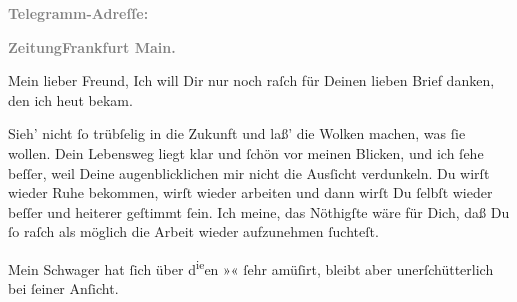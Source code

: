 \pstart
           \textcolor{gray}{\textbf{Telegramm-Adreſſe:}}\pend
           
\pstart
           \textcolor{gray}{\textbf{ZeitungFrankfurt Main.}}\pend
           
\pstart\center{}Mein lieber Freund,\pend\vspace{0.5em}
\pstart
           Ich will Dir nur noch raſch für Deinen lieben Brief danken, den ich heut bekam.\pend
           
\pstart
           Sieh’ nicht{ }ſo trübſelig in die Zukunft und laß’ die Wolken machen, was{ }ſie wollen.
               Dein Lebensweg liegt klar und{ }ſchön vor meinen Blicken, und ich{ }ſehe beſſer, weil
               Deine augenblicklichen \label{K_L02825-2v}\label{K_L02825-2} mir nicht die Ausſicht verdunkeln. Du wirſt wieder Ruhe
               bekommen, wirſt wieder arbeiten und dann wirſt Du{ }ſelbſt wieder {\pb}beſſer und heiterer geſtimmt{ }ſein. Ich meine, das
               Nöthigſte wäre für Dich, daß Du{ }ſo raſch als möglich die Arbeit wieder aufzunehmen{ }ſuchteſt.\pend
           
\pstart
           Mein Schwager hat{ }ſich über d\substVorne{}\textsuperscript{ie}\substDazwischen{}en\substHinten{} »\label{K_L02825-3v}\label{K_L02825-3}«{ }ſehr amüſirt, bleibt
               aber \label{K_L02825-4v}\label{K_L02825-4}
               unerſchütterlich bei{ }ſeiner Anſicht.\pend
           
